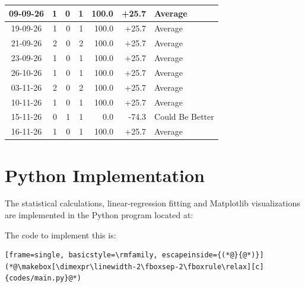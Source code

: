 \documentclass[journal]{IEEEtran}
\numberwithin{equation}{subsection}
\begin{document}
\begin{longtable}{|c|r|r|r|r|r|l|}
09-09-26 & 1 & 0 & 1 & 100.0 & +25.7 & Average\\ \hline
19-09-26 & 1 & 0 & 1 & 100.0 & +25.7 & Average\\ \hline
21-09-26 & 2 & 0 & 2 & 100.0 & +25.7 & Average\\ \hline
23-09-26 & 1 & 0 & 1 & 100.0 & +25.7 & Average\\ \hline
26-10-26 & 1 & 0 & 1 & 100.0 & +25.7 & Average\\ \hline
03-11-26 & 2 & 0 & 2 & 100.0 & +25.7 & Average\\ \hline
10-11-26 & 1 & 0 & 1 & 100.0 & +25.7 & Average\\ \hline
15-11-26 & 0 & 1 & 1 & 0.0 & -74.3 & Could Be Better\\ \hline
16-11-26 & 1 & 0 & 1 & 100.0 & +25.7 & Average\\ \hline

\end{longtable}
\normalsize

\section{Python Implementation}
\label{app:python-implementation}

The statistical calculations, linear-regression fitting and
Matplotlib visualizations are implemented in the Python
program located at:

The code to implement this is: \begin{lstlisting}[frame=single, basicstyle=\rmfamily, escapeinside={(*@}{@*)}]
(*@\makebox[\dimexpr\linewidth-2\fboxsep-2\fboxrule\relax][c]{codes/main.py}@*)
\end{lstlisting}
\end{document}
